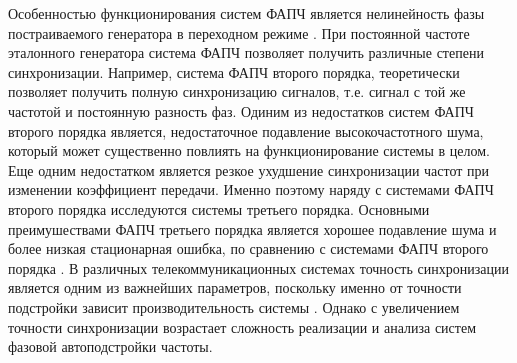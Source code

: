\documentclass[a4paper,14pt]{article} %
\theoremstyle{cited}
\begin{document}

Особенностью функционирования систем ФАПЧ является нелинейность фазы постраиваемого генератора в переходном режиме \cite{kuznetsov_nonlinear}. При постоянной частоте эталонного генератора система ФАПЧ позволяет получить различные степени синхронизации. Например, система ФАПЧ второго порядка, теоретически позволяет получить полную синхронизацию сигналов, т.е. сигнал с той же частотой и постоянную разность фаз. Одиним из недостатков систем ФАПЧ второго порядка является, недостаточное подавление высокочастотного шума, который может существенно повлиять на функционирование системы в целом. Еще одним недостатком является резкое ухудшение синхронизации частот при изменении коэффициент передачи. Именно поэтому наряду с системами ФАПЧ второго порядка исследуются системы третьего порядка. Основными преимушествами ФАПЧ третьего порядка является хорошее подавление шума и более низкая стационарная ошибка, по сравнению с системами ФАПЧ второго порядка \cite{thirdOrderPLL}. В различных телекоммуникационных системах точность синхронизации является одним из важнейших параметров, поскольку именно от точности подстройки зависит производительность системы \cite{UsageOfThirdOrder1}. Однако с увеличением точности синхронизации возрастает сложность реализации и анализа систем фазовой автоподстройки частоты. 
\end{document}
